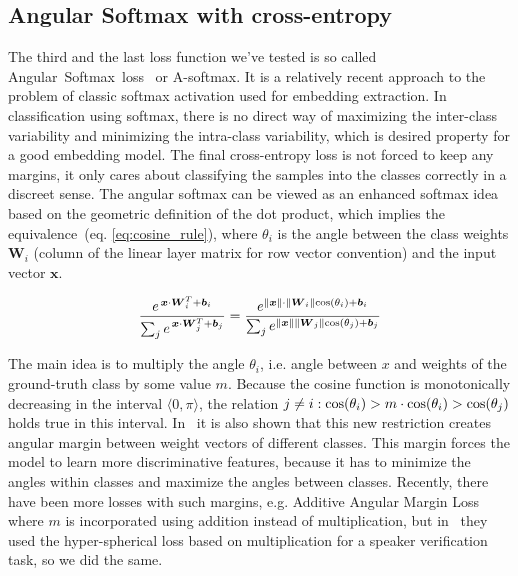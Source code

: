 \subsection*{Angular Softmax with cross-entropy}

The third and the last loss function we've tested is so called Angular~Softmax~loss~\cite{A_softmax_original} or A-softmax. It is a relatively recent approach to the problem of classic softmax activation used for embedding extraction. In classification using softmax, there is no direct way of maximizing the inter-class variability and minimizing the intra-class variability, which is desired property for a good embedding model. The final cross-entropy loss is not forced to keep any margins, it only cares about classifying the samples into the classes correctly in a discreet sense. The angular softmax can be viewed as an enhanced softmax idea based on the geometric definition of the dot product, which implies the equivalence~(eq. \ref{eq:cosine_rule}), where $ \theta_i $ is the angle between the class weights $ \boldsymbol{W}_i $ (column of the linear layer matrix for row vector convention) and the input vector $ \boldsymbol{x} $.

\begin{equation} \label{eq:cosine_rule}
\frac{e^{\,\boldsymbol{x} \cdot \boldsymbol{W}_i^T + \boldsymbol{b}_i}}
{\sum_{j} e^{\,\boldsymbol{x} \cdot \boldsymbol{W}_j^T + \boldsymbol{b}_j}} =
\frac{e^{\lVert\boldsymbol{x}\rVert \cdot \lVert\boldsymbol{W}_i\rVert \textnormal{cos}(\theta_i)  + \boldsymbol{b}_i}}
{\sum_{j} e^{\lVert\boldsymbol{x}\rVert \lVert\boldsymbol{W}_j\rVert \textnormal{cos}(\theta_j)  + \boldsymbol{b}_j}}
\end{equation}

\medskip
\noindent
The main idea is to multiply the angle $ \theta_i $, i.e. angle between $ x $ and weights of the ground-truth class by some value $ m $. Because the cosine function is monotonically decreasing in the interval $ \langle 0, \pi \rangle $, the relation $ j \neq i : \textnormal{cos}(\theta_i) > m \cdot \textnormal{cos}(\theta_i) > \textnormal{cos}(\theta_j) $ holds true in this interval. In~\cite{A_softmax_original} it is also shown that this new restriction creates angular margin between weight vectors of different classes. This margin forces the model to learn more discriminative features, because it has to minimize the angles within classes and maximize the angles between classes. Recently, there have been more losses with such margins, e.g. Additive Angular Margin Loss \cite{arc_face} where $ m $ is incorporated using addition instead of multiplication, but in~\cite{A_softmax} they used the hyper-spherical loss based on multiplication for a speaker verification task, so we did the same.

